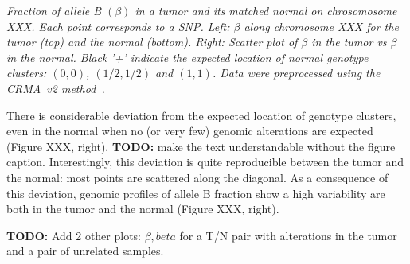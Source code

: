 \documentclass[10pt]{bmc_article}
\newenvironment{bmcformat}{\fussy\setboolean{publ}{true}}{\fussy}
\newenvironment{TODO}{\color{red}\textbf{TODO:}}{}
\begin{document}
\begin{bmcformat}

\emph{Fraction of allele B $(\beta)$ in a tumor and its matched normal on chrosomosome XXX. Each point corresponds to a SNP. Left: $\beta$  along chromosome XXX for the tumor (top) and the normal (bottom). Right: Scatter plot of $\beta$ in the tumor vs $\beta$ in the normal. Black '+' indicate the expected location of normal genotype clusters: $(0,0)$, $(1/2,1/2)$ and $(1,1)$. Data were preprocessed using the CRMA~v2 method~\cite{BengtssonH_etal_2009b}.
}

There is considerable deviation from the expected location of genotype clusters, even in the normal when no (or very few) genomic alterations are expected (Figure XXX, right).
\begin{TODO}
  make the text understandable without the figure caption.
\end{TODO}
Interestingly, this deviation is quite reproducible between the tumor and the normal: most points are scattered along the diagonal. As a consequence of this deviation, genomic profiles of allele B fraction show a high variability are  both in the tumor and the normal (Figure XXX, right). 

\begin{TODO}
  Add 2 other plots: $\beta, beta$ for a T/N pair with alterations in the tumor and a pair of unrelated samples.
\end{TODO}


\end{bmcformat}
\end{document}
